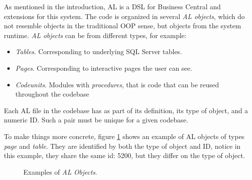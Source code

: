 \documentclass{article}
\begin{document}
As mentioned in the introduction, AL is a DSL for Business Central and extensions for this system. The code is organized in several \emph{AL objects}, which do not resemble objects in the traditional OOP sense, but objects from the system runtime. \emph{AL objects} can be from different types, for example:
\begin{itemize}
\item \emph{Tables}. Corresponding to underlying SQL Server tables.
\item \emph{Pages}. Corresponding to interactive pages the user can see.
\item \emph{Codeunits}. Modules with \emph{procedures}, that is code that can be reused throughout the codebase
\end{itemize}

Each AL file in the codebase has as part of its definition, its type of object, and a numeric ID. Such a pair must be unique for a given codebase.

To make things more concrete, figure \ref{fig:al-examples} shows an example of AL objects of types \emph{page} and \emph{table}. They are identified by both the type of object and ID, notice in this example, they share the same id: 5200, but they differ on the type of object.
\begin{figure}[H]
  \centering
  \qquad
  \caption{Examples of \emph{AL Objects}. }
  \label{fig:al-examples}
\end{figure}
\end{document}
